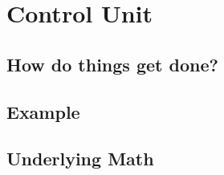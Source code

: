 \section{Control Unit} \label{sec:control_unit}
\subsection{How do things get done?} \label{sec:control_unit:working_principle}

\subsection{Example} \label{sec:control_unit:example}

\subsection{Underlying Math} \label{sec:control_unit:math}